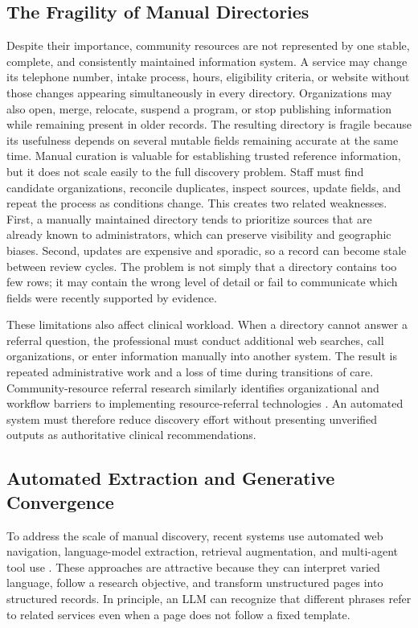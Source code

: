 \documentclass[12pt,oneside]{report}
\begin{document}
\subsection{The Fragility of Manual Directories}
Despite their importance, community resources are not represented by one stable, complete, and consistently maintained information system. A service may change its telephone number, intake process, hours, eligibility criteria, or website without those changes appearing simultaneously in every directory. Organizations may also open, merge, relocate, suspend a program, or stop publishing information while remaining present in older records. The resulting directory is fragile because its usefulness depends on several mutable fields remaining accurate at the same time.
Manual curation is valuable for establishing trusted reference information, but it does not scale easily to the full discovery problem. Staff must find candidate organizations, reconcile duplicates, inspect sources, update fields, and repeat the process as conditions change. This creates two related weaknesses. First, a manually maintained directory tends to prioritize sources that are already known to administrators, which can preserve visibility and geographic biases. Second, updates are expensive and sporadic, so a record can become stale between review cycles. The problem is not simply that a directory contains too few rows; it may contain the wrong level of detail or fail to communicate which fields were recently supported by evidence.

These limitations also affect clinical workload. When a directory cannot answer a referral question, the professional must conduct additional web searches, call organizations, or enter information manually into another system. The result is repeated administrative work and a loss of time during transitions of care. Community-resource referral research similarly identifies organizational and workflow barriers to implementing resource-referral technologies \cite{20}. An automated system must therefore reduce discovery effort without presenting unverified outputs as authoritative clinical recommendations.

\subsection{Automated Extraction and Generative Convergence}
To address the scale of manual discovery, recent systems use automated web navigation, language-model extraction, retrieval augmentation, and multi-agent tool use \cite{10,13,15,19,21}. These approaches are attractive because they can interpret varied language, follow a research objective, and transform unstructured pages into structured records. In principle, an LLM can recognize that different phrases refer to related services even when a page does not follow a fixed template.
\end{document}
